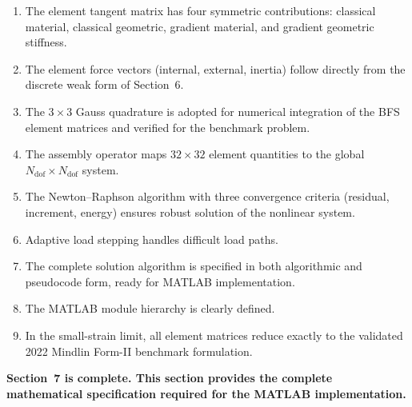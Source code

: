 \documentclass[11pt]{article}
\begin{document}
\begin{enumerate}
\item The element tangent matrix has four symmetric contributions:
  classical material, classical geometric, gradient material, and
  gradient geometric stiffness.

\item The element force vectors (internal, external, inertia) follow
  directly from the discrete weak form of Section~6.

\item The $3\times 3$ Gauss quadrature is adopted for numerical
  integration of the BFS element matrices and verified for the
  benchmark problem.

\item The assembly operator maps $32\times 32$ element quantities to
  the global $N_{\mathrm{dof}}\times N_{\mathrm{dof}}$ system.

\item The Newton--Raphson algorithm with three convergence criteria
  (residual, increment, energy) ensures robust solution of the
  nonlinear system.

\item Adaptive load stepping handles difficult load paths.

\item The complete solution algorithm is specified in both algorithmic
  and pseudocode form, ready for MATLAB implementation.

\item The MATLAB module hierarchy is clearly defined.

\item In the small-strain limit, all element matrices reduce exactly
  to the validated 2022 Mindlin Form-II benchmark formulation.
\end{enumerate}

\textbf{Section~7 is complete. This section provides the complete
mathematical specification required for the MATLAB implementation.}


\end{document}
